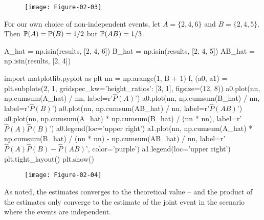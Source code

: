 \begin{figure}[H]
\centering
\texttt{[image: Figure-02-03]}
\end{figure}

For our own choice of non-independent events, let \(A = \{ 2, 4, 6\}\)
and \(B = \{2, 4, 5\}\). Then \(\operatorname{\mathbb{P}}(A) = \operatorname{\mathbb{P}}(B) = 1/2\)
but \(\operatorname{\mathbb{P}}(AB) = 1/3\).

\begin{python}
A_hat = np.isin(results, [2, 4, 6])
B_hat = np.isin(results, [2, 4, 5])
AB_hat = np.isin(results, [2, 4])
\end{python}

\begin{python}
import matplotlib.pyplot as plt
nn = np.arange(1, B + 1)
f, (a0, a1) = plt.subplots(2, 1, gridspec_kw={'height_ratios': [3, 1]}, figsize=(12, 8))
a0.plot(nn, np.cumsum(A_hat) / nn, label=r'$\hat{P}(A)$')
a0.plot(nn, np.cumsum(B_hat) / nn, label=r'$\hat{P}(B)$')
a0.plot(nn, np.cumsum(AB_hat) / nn, label=r'$\hat{P}(AB)$')
a0.plot(nn, np.cumsum(A_hat) * np.cumsum(B_hat) / (nn * nn), label=r'$\hat{P}(A) \hat{P}(B)$')
a0.legend(loc='upper right')
a1.plot(nn, np.cumsum(A_hat) * np.cumsum(B_hat) / (nn * nn) - np.cumsum(AB_hat) / nn, 
         label=r'$\hat{P}(A) \hat{P}(B)- \hat{P}(AB)$', color='purple')
a1.legend(loc='upper right')
plt.tight_layout()
plt.show()
\end{python}

\begin{figure}[H]
\centering
\texttt{[image: Figure-02-04]}
\end{figure}

As noted, the estimates converges to the theoretical value -- and the
product of the estimates only converge to the estimate of the joint
event in the scenario where the events are independent.
